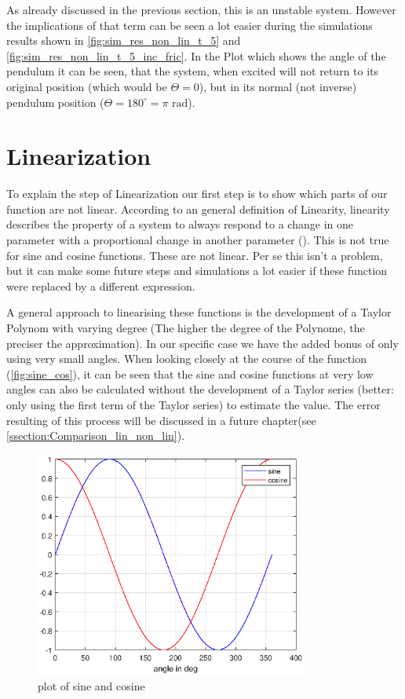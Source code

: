 As already discussed in the previous section, this is an unstable system. However the implications of that term can be seen a lot easier during the simulations results shown in \autoref{fig:sim_res_non_lin_t_5} and \autoref{fig:sim_res_non_lin_t_5_inc_fric}. In the Plot which shows the angle of the pendulum it can be seen, that the system, when excited will not return to its original position (which would be $\Theta=0$), but in its normal (not inverse) pendulum position ($\Theta = 180^\circ =\pi \text{ rad}$).
\section{Linearization}
To explain the step of Linearization our first step is to show which parts of our function are not linear. According to an general definition of Linearity, linearity describes the property of a system to always respond to a change in one parameter with a proportional change in another parameter (\cite{dewiki:Linearity}). This is not true for sine and cosine functions. These are not linear. Per se this isn't a problem, but it can make some future steps and simulations a lot easier if these function were replaced by a different expression.

A general approach to linearising these functions is the development of a Taylor Polynom with varying degree (The higher the degree of the Polynome, the preciser the approximation). In our specific case we have the added bonus of only using very small angles. When looking closely at the course of the function (\autoref{fig:sine_cos}), it can be seen that the sine and cosine functions at very low angles can also be calculated without the development of a Taylor series (better: only using the first term of the Taylor series) to estimate the value. The error resulting of this process will be discussed in a future chapter(see \autoref{ssection:Comparison_lin_non_lin}).
\begin{figure}[H]
    \centering
    \includegraphics[width=0.8\textwidth]{Lab_report/pics/plots/sin_cos.eps}
    \caption{plot of sine and cosine}
    \label{fig:sine_cos}
\end{figure}
